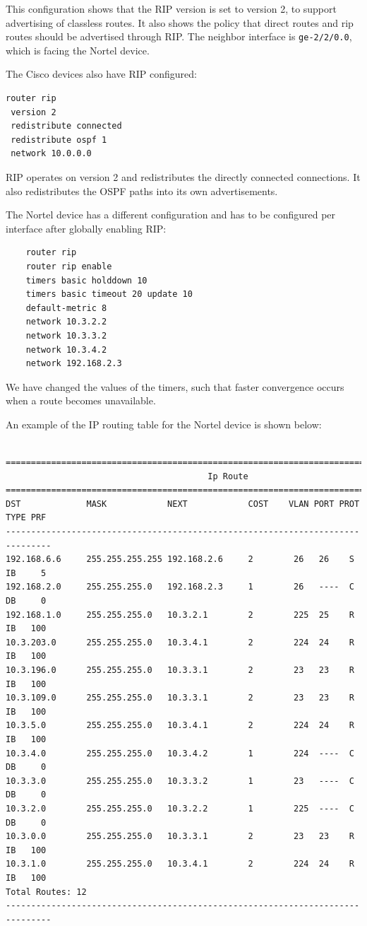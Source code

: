 \documentclass[10pt,a4paper]{article}
\begin{document}
This configuration shows that the RIP version is set to version 2, to support advertising of classless routes. It also shows the policy that direct routes and rip routes should be advertised through RIP. The neighbor interface is \texttt{ge-2/2/0.0}, which is facing the Nortel device.

The Cisco devices also have RIP configured:
\begin{verbatim}
router rip
 version 2
 redistribute connected
 redistribute ospf 1
 network 10.0.0.0
\end{verbatim}

RIP operates on version 2 and redistributes the directly connected connections. It also redistributes the OSPF paths into its own advertisements.

The Nortel device has a different configuration and has to be configured per interface after globally enabling RIP:
\begin{verbatim}
    router rip
    router rip enable
    timers basic holddown 10
    timers basic timeout 20 update 10
    default-metric 8
    network 10.3.2.2
    network 10.3.3.2
    network 10.3.4.2
    network 192.168.2.3
\end{verbatim}

We have changed the values of the timers, such that faster convergence occurs when a route becomes unavailable.

An example of the IP routing table for the Nortel device is shown below:
\begin{verbatim}
    ===============================================================================
                                        Ip Route
===============================================================================
DST             MASK            NEXT            COST    VLAN PORT PROT TYPE PRF
-------------------------------------------------------------------------------
192.168.6.6     255.255.255.255 192.168.2.6     2        26   26    S  IB     5
192.168.2.0     255.255.255.0   192.168.2.3     1        26   ----  C  DB     0
192.168.1.0     255.255.255.0   10.3.2.1        2        225  25    R  IB   100
10.3.203.0      255.255.255.0   10.3.4.1        2        224  24    R  IB   100
10.3.196.0      255.255.255.0   10.3.3.1        2        23   23    R  IB   100
10.3.109.0      255.255.255.0   10.3.3.1        2        23   23    R  IB   100
10.3.5.0        255.255.255.0   10.3.4.1        2        224  24    R  IB   100
10.3.4.0        255.255.255.0   10.3.4.2        1        224  ----  C  DB     0
10.3.3.0        255.255.255.0   10.3.3.2        1        23   ----  C  DB     0
10.3.2.0        255.255.255.0   10.3.2.2        1        225  ----  C  DB     0
10.3.0.0        255.255.255.0   10.3.3.1        2        23   23    R  IB   100
10.3.1.0        255.255.255.0   10.3.4.1        2        224  24    R  IB   100
Total Routes: 12
-------------------------------------------------------------------------------
\end{verbatim}
\end{document}
